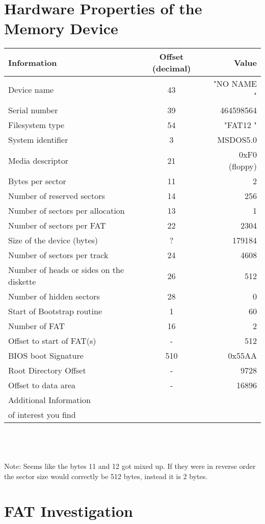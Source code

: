 \documentclass{article}
\begin{document}
\section{Hardware Properties of the Memory Device}
\begin{tabular}{l c r}
    \hline
    \textbf{Information} & \textbf{Offset (decimal)} & \textbf{Value}\\
    \hline
    Device name & 43 & "NO NAME    "\\
    Serial number & 39 & 464598564\\
    Filesystem type & 54 & "FAT12   "\\
    System identifier & 3 & MSDOS5.0\\
    Media descriptor & 21 & 0xF0 (floppy)\\
    Bytes per sector & 11 & 2\\
    Number of reserved sectors & 14 & 256\\
    Number of sectors per allocation & 13 & 1\\
    Number of sectors per FAT & 22 &2304\\
    Size of the device (bytes) & ? & 179184\\
    Number of sectors per track & 24 & 4608\\
    Number of heads or sides on the diskette & 26 & 512\\
    Number of hidden sectors & 28 & 0\\
    Start of Bootstrap routine & 1 &60\\
    Number of FAT & 16 & 2\\
    Offset to start of FAT(s) & - & 512\\
    BIOS boot Signature & 510 & 0x55AA\\
    Root Directory Offset & - & 9728\\
    Offset to data area & - & 16896\\
    Additional Information & &\\
    of interest you find & &\\
    \hline
\end{tabular}\\
\\
\\
Note: Seems like the bytes 11 and 12 got mixed up. If they were in reverse order the sector size would correctly be 512 bytes, instead it is 2 bytes.

\section{FAT Investigation}
\end{document}
